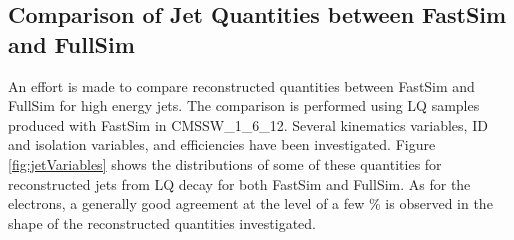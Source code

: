 \documentclass[colclass=cmspaper]{combine}
\begin{document}
\begin{linenumbers}
 

%

\subsection{Comparison of Jet Quantities between FastSim and FullSim}

An effort is made to compare reconstructed quantities between FastSim and FullSim for high energy jets.
The comparison is performed using LQ samples produced with FastSim in CMSSW\_1\_6\_12. 
Several kinematics variables, ID and isolation variables, and efficiencies have been investigated. 
Figure \ref{fig:jetVariables} shows the distributions of some of these quantities for reconstructed jets from LQ decay 
for both FastSim and FullSim.
As for the electrons, a generally good agreement at the level of a few \% is observed in the shape of the reconstructed quantities investigated.


\end{linenumbers}
\end{document}

